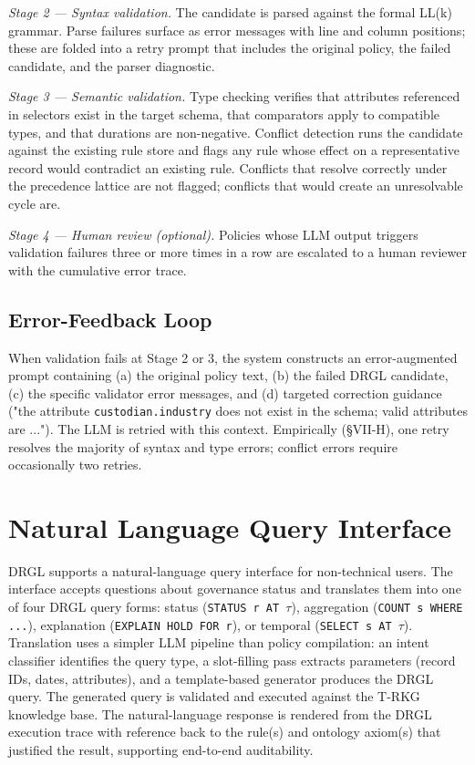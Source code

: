 \documentclass{ieeeaccess}
\begin{document}
\textit{Stage 2 — Syntax validation.} The candidate is parsed against the formal LL(k) grammar. Parse failures surface as error messages with line and column positions; these are folded into a retry prompt that includes the original policy, the failed candidate, and the parser diagnostic.

\textit{Stage 3 — Semantic validation.} Type checking verifies that attributes referenced in selectors exist in the target schema, that comparators apply to compatible types, and that durations are non-negative. Conflict detection runs the candidate against the existing rule store and flags any rule whose effect on a representative record would contradict an existing rule. Conflicts that resolve correctly under the precedence lattice are not flagged; conflicts that would create an unresolvable cycle are.

\textit{Stage 4 — Human review (optional).} Policies whose LLM output triggers validation failures three or more times in a row are escalated to a human reviewer with the cumulative error trace.

\subsection{Error-Feedback Loop}

When validation fails at Stage 2 or 3, the system constructs an error-augmented prompt containing (a) the original policy text, (b) the failed DRGL candidate, (c) the specific validator error messages, and (d) targeted correction guidance ("the attribute \texttt{custodian.industry} does not exist in the schema; valid attributes are ..."). The LLM is retried with this context. Empirically (§VII-H), one retry resolves the majority of syntax and type errors; conflict errors require occasionally two retries.

\section{Natural Language Query Interface}

DRGL supports a natural-language query interface for non-technical users. The interface accepts questions about governance status and translates them into one of four DRGL query forms: status (\texttt{STATUS r AT $\tau$}), aggregation (\texttt{COUNT s WHERE ...}), explanation (\texttt{EXPLAIN HOLD FOR r}), or temporal (\texttt{SELECT s AT $\tau$}). Translation uses a simpler LLM pipeline than policy compilation: an intent classifier identifies the query type, a slot-filling pass extracts parameters (record IDs, dates, attributes), and a template-based generator produces the DRGL query. The generated query is validated and executed against the T-RKG knowledge base. The natural-language response is rendered from the DRGL execution trace with reference back to the rule(s) and ontology axiom(s) that justified the result, supporting end-to-end auditability.
\end{document}
